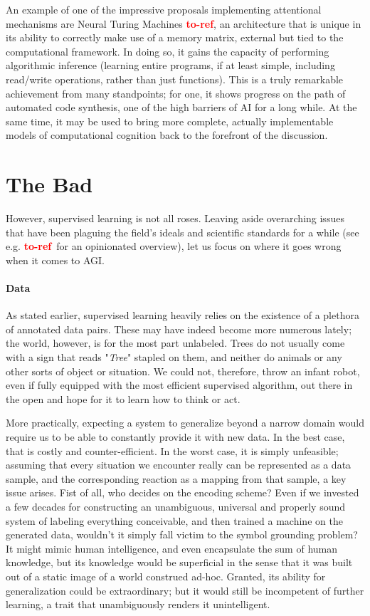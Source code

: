 \documentclass[]{article}
\newcommand\toref{\textcolor{red}{\bf{to-ref}}}
\begin{document}
An example of one of the impressive proposals implementing attentional mechanisms are Neural Turing Machines \toref , an architecture that is unique in its ability to correctly make use of a memory matrix, external but tied to the computational framework. In doing so, it gains the capacity of performing algorithmic inference (learning entire programs, if at least simple, including read/write operations, rather than just functions). This is a truly remarkable achievement from many standpoints; for one, it shows progress on the path of automated code synthesis, one of the high barriers of AI for a long while. At the same time, it may be used to bring more complete, actually implementable models of computational cognition back to the forefront of the discussion.

\section{The Bad}
However, supervised learning is not all roses. Leaving aside overarching issues that have been plaguing the field's ideals and scientific standards for a while (see e.g. \toref \ for an opinionated overview), let us focus on where it goes wrong when it comes to AGI.

\paragraph{Data}
As stated earlier, supervised learning heavily relies on the existence of a plethora of annotated data pairs. These may have indeed become more numerous lately; the world, however, is for the most part unlabeled. Trees do not usually come with a sign that reads "\textit{Tree}" stapled on them, and neither do animals or any other sorts of object or situation. We could not, therefore, throw an infant robot, even if fully equipped with the most efficient supervised algorithm, out there in the open and hope for it to learn how to think or act. 

More practically, expecting a system to generalize beyond a narrow domain would require us to be able to constantly provide it with new data. In the best case, that is costly and counter-efficient. In the worst case, it is simply unfeasible; assuming that every situation we encounter really can be represented as a data sample, and the corresponding reaction as a mapping from that sample, a key issue arises. Fist of all, who decides on the encoding scheme? Even if we invested a few decades for constructing an unambiguous, universal and properly sound system of labeling everything conceivable, and then trained a machine on the generated data, wouldn't it simply fall victim to the symbol grounding problem? It might mimic human intelligence, and even encapsulate the sum of human knowledge, but its knowledge would be superficial in the sense that it was built out of a static image of a world construed ad-hoc. Granted, its ability for generalization could be extraordinary; but it would still be incompetent of further learning, a trait that unambiguously renders it unintelligent.
\end{document}
